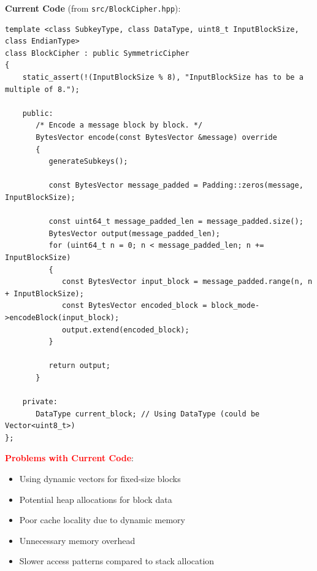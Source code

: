 \documentclass[11pt,a4paper]{article}
\begin{document}
\textbf{Current Code} (from \texttt{src/BlockCipher.hpp}):
\begin{lstlisting}
template <class SubkeyType, class DataType, uint8_t InputBlockSize, class EndianType>
class BlockCipher : public SymmetricCipher
{   
    static_assert(!(InputBlockSize % 8), "InputBlockSize has to be a multiple of 8.");

    public:   
       /* Encode a message block by block. */
       BytesVector encode(const BytesVector &message) override
       {
          generateSubkeys();

          const BytesVector message_padded = Padding::zeros(message, InputBlockSize);

          const uint64_t message_padded_len = message_padded.size();
          BytesVector output(message_padded_len);
          for (uint64_t n = 0; n < message_padded_len; n += InputBlockSize)
          {
             const BytesVector input_block = message_padded.range(n, n + InputBlockSize);
             const BytesVector encoded_block = block_mode->encodeBlock(input_block);
             output.extend(encoded_block);         
          }

          return output;
       }

    private:
       DataType current_block; // Using DataType (could be Vector<uint8_t>)
};
\end{lstlisting}

\textcolor{red}{\textbf{Problems with Current Code}}:
\begin{itemize}
    \item Using dynamic vectors for fixed-size blocks
    \item Potential heap allocations for block data
    \item Poor cache locality due to dynamic memory
    \item Unnecessary memory overhead
    \item Slower access patterns compared to stack allocation
\end{itemize}
\end{document}
